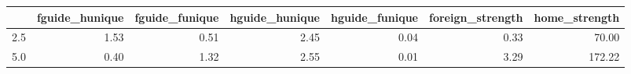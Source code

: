 \begin{tabular}{lrrrrrr}
\toprule
 & fguide_hunique & fguide_funique & hguide_hunique & hguide_funique & foreign_strength & home_strength \\
\midrule
2.5 & 1.53 & 0.51 & 2.45 & 0.04 & 0.33 & 70.00 \\
5.0 & 0.40 & 1.32 & 2.55 & 0.01 & 3.29 & 172.22 \\
\bottomrule
\end{tabular}
